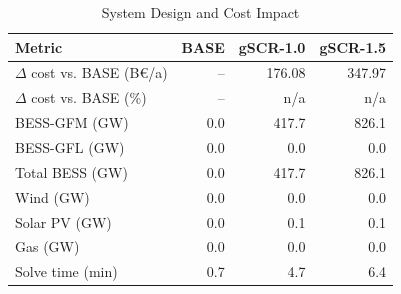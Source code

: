 \begin{table}[!t]
\centering
\caption{System Design and Cost Impact}
\label{tab:system_design}
\renewcommand{\arraystretch}{1.08}
\begin{tabular}{lrrr}
\toprule
Metric & BASE & gSCR-1.0 & gSCR-1.5 \\
\midrule
\(\Delta\) cost vs. BASE (B\euro/a) & -- & 176.08 & 347.97 \\
\(\Delta\) cost vs. BASE (\%)       & -- & n/a & n/a \\
BESS-GFM (GW)                       & 0.0 & 417.7 & 826.1 \\
BESS-GFL (GW)                       & 0.0 & 0.0 & 0.0 \\
Total BESS (GW)                     & 0.0 & 417.7 & 826.1 \\
Wind (GW)                           & 0.0 & 0.0 & 0.0 \\
Solar PV (GW)                       & 0.0 & 0.1 & 0.1 \\
Gas (GW)                            & 0.0 & 0.0 & 0.0 \\
Solve time (min)                    & 0.7 & 4.7 & 6.4 \\
\bottomrule
\end{tabular}
\end{table}
